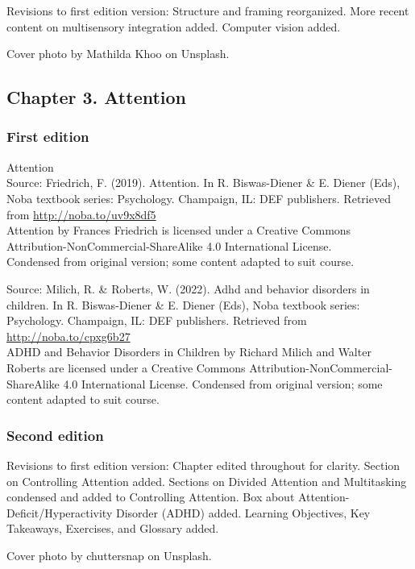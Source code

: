 \documentclass[
]{krantz}
\begin{document}
Revisions to first edition version: Structure and framing reorganized. More recent content on multisensory integration added. Computer vision added.

Cover photo by Mathilda Khoo on Unsplash.

\subsection*{Chapter 3. Attention}\label{chapter-3.-attention}


\subsubsection*{First edition}\label{first-edition-3}


Attention\\
Source: Friedrich, F. (2019). Attention. In R. Biswas-Diener \& E. Diener (Eds), Noba textbook series: Psychology. Champaign, IL: DEF publishers. Retrieved from \url{http://noba.to/uv9x8df5}\\
Attention by Frances Friedrich is licensed under a Creative Commons Attribution-NonCommercial-ShareAlike 4.0 International License.\\
Condensed from original version; some content adapted to suit course.

Source: Milich, R. \& Roberts, W. (2022). Adhd and behavior disorders in children. In R. Biswas-Diener \& E. Diener (Eds), Noba textbook series: Psychology. Champaign, IL: DEF publishers. Retrieved from \url{http://noba.to/cpxg6b27}\\
ADHD and Behavior Disorders in Children by Richard Milich and Walter Roberts are licensed under a Creative Commons Attribution-NonCommercial-ShareAlike 4.0 International License.
Condensed from original version; some content adapted to suit course.

\subsubsection*{Second edition}\label{second-edition-3}


Revisions to first edition version: Chapter edited throughout for clarity. Section on Controlling Attention added. Sections on Divided Attention and Multitasking condensed and added to Controlling Attention. Box about Attention-Deficit/Hyperactivity Disorder (ADHD) added. Learning Objectives, Key Takeaways, Exercises, and Glossary added.

Cover photo by chuttersnap on Unsplash.
\end{document}
